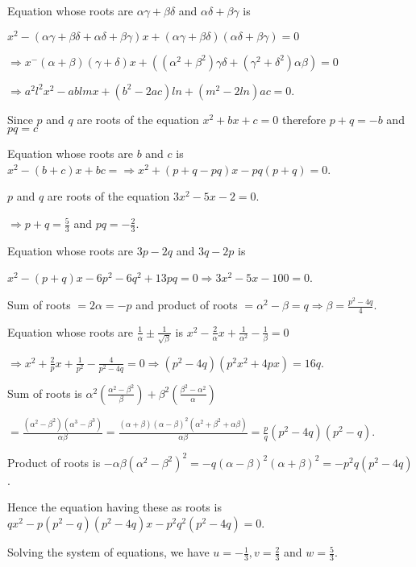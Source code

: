   Equation whose roots are $\alpha\gamma + \beta\delta$ and $\alpha\delta + \beta\gamma$ is

  $x^2 - (\alpha\gamma + \beta\delta + \alpha\delta + \beta\gamma)x + (\alpha\gamma +
  \beta\delta)(\alpha\delta + \beta\gamma) = 0$

  $\Rightarrow x^ - (\alpha + \beta)(\gamma + \delta)x + ((\alpha^2 + \beta^2)\gamma\delta + (\gamma^2 +
  \delta^2)\alpha\beta) = 0$

  $\Rightarrow a^2l^2x^2 - ablmx + (b^2 - 2ac)ln + (m^2 - 2ln)ac = 0$.
\item Since $p$ and $q$ are roots of the equation $x^2 + bx + c = 0$ therefore $p + q = -b$ and
  $pq = c$

  Equation whose roots are $b$ and $c$ is $x^2 - (b + c)x + bc = \Rightarrow x^2 +(p + q - pq)x - pq(p + q)
  = 0$.
\item $p$ and $q$ are roots of the equation $3x^2 - 5x - 2 = 0$.

  $\Rightarrow p + q = \frac{5}{3}$ and $pq = -\frac{2}{3}$.

  Equation whose roots are $3p - 2q$ and $3q - 2p$ is

  $x^2 - (p + q)x - 6p^2 - 6q^2 + 13pq = 0\Rightarrow 3x^2 - 5x - 100 = 0$.
\item Sum of roots $= 2\alpha = -p$ and product of roots $= \alpha^2 - \beta = q \Rightarrow \beta =
  \frac{p^2 - 4q}{4}$.

  Equation whose roots are $\frac{1}{\alpha}\pm \frac{1}{\sqrt{\beta}}$ is $x^2 - \frac{2}{\alpha}x +
  \frac{1}{\alpha^2} - \frac{1}{\beta} = 0$

  $\Rightarrow x^2 + \frac{2}{p}x + \frac{1}{p^2} - \frac{4}{p^2 - 4q} = 0\Rightarrow (p^2 - 4q)(p^2x^2 +
  4px) = 16q$.
\item Sum of roots is $\alpha^2\left(\frac{\alpha^2 - \beta^2}{\beta}\right) + \beta^2\left(\frac{\beta^2 -
  \alpha^2}{\alpha}\right)$

  $= \frac{(\alpha^2 - \beta^2)(\alpha^3 - \beta^3)}{\alpha\beta} = \frac{(\alpha + \beta)(\alpha -
  \beta)^2(\alpha^2 + \beta^2 + \alpha\beta)}{\alpha\beta}= \frac{p}{q}(p^2 - 4q)(p^2 - q)$.

  Product of roots is $-\alpha\beta(\alpha^2 - \beta^2)^2 = -q(\alpha - \beta)^2(\alpha + \beta)^2 =
  -p^2q(p^2 - 4q)$.

  Hence the equation having these as roots is $qx^2 - p(p^2 - q)(p^2 - 4q)x - p^2q^2(p^2 - 4q) = 0$.
\item Solving the system of equations, we have $u = -\frac{1}{3}, v = \frac{2}{3}$ and $w = \frac{5}{3}$.

